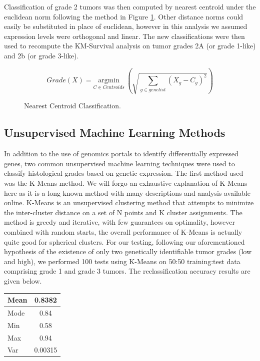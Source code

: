 \documentclass[a4paper,10pt]{article}
\begin{document}
Classification of grade 2 tumors was then computed by nearest centroid under the euclidean norm following the method in Figure \ref{classify}.
Other distance norms could easily be substituted in place of euclidean, however in this analysis we assumed expression levels were orthogonal
and linear. The new classifications were then used to recompute the KM-Survival analysis on tumor grades 2A (or grade 1-like) and 2b (or grade 3-like).
\begin{figure}
 $$
Grade(X) = \underset{C \in Centroids} {\mathrm{argmin}} ~ \left( \sqrt{\sum_{g\in genelist}{ (X_{g} - C_{g})^2}}\right)
$$
\caption{Nearest Centroid Classification.}\label{classify}
\end{figure}

\subsection{Unsupervised Machine Learning Methods}
In addition to the use of genomics portals to identify differentially expressed genes, two common unsupervised machine learning techniques were
used to classify histological grades based on genetic expression. The first method used was the K-Means method. We will forgo an exhaustive explanation
of K-Means here as it is a long known method with many descriptions and analysis available online. K-Means is an unsupervised clustering method
that attempts to minimize the inter-cluster distance on a set of N points and K cluster assignments. The method is greedy and iterative, with few guarantees
on optimality, however combined with random starts, the overall performance of K-Means is actually quite good for spherical clusters\cite{kmeans}. 
For our testing, following our aforementioned hypothesis of the existence of only two genetically identifiable tumor grades (low and high), we performed
100 tests using K-Means on 50:50 training:test data comprising grade 1 and grade 3 tumors. The reclassification accuracy results are given below.\\
\begin{center}
\begin{tabular}{| l | c | }
    \hline
    Mean & 0.8382  \\ \hline
    Mode & 0.84 \\ \hline
    Min & 0.58  \\ \hline
    Max & 0.94  \\ \hline
     Var &  0.00315  \\ \hline
  \end{tabular}
\end{center}
\end{document}
